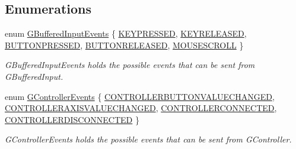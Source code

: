 \subsection*{Enumerations}
\begin{DoxyCompactItemize}
\item 
enum \mbox{\hyperlink{namespace_g_w_1_1_s_y_s_t_e_m_a309fd3a92512dd2bfa8065d99c0d7fcb}{G\+Buffered\+Input\+Events}} \{ \newline
\mbox{\hyperlink{namespace_g_w_1_1_s_y_s_t_e_m_a309fd3a92512dd2bfa8065d99c0d7fcbaf8bb58b0791c2d5d33b224213327f960}{K\+E\+Y\+P\+R\+E\+S\+S\+ED}}, 
\mbox{\hyperlink{namespace_g_w_1_1_s_y_s_t_e_m_a309fd3a92512dd2bfa8065d99c0d7fcbabb708a216e7e8ef33cc542e6def7a688}{K\+E\+Y\+R\+E\+L\+E\+A\+S\+ED}}, 
\mbox{\hyperlink{namespace_g_w_1_1_s_y_s_t_e_m_a309fd3a92512dd2bfa8065d99c0d7fcba56314f1a5b4d09751ed354a45a3a78fb}{B\+U\+T\+T\+O\+N\+P\+R\+E\+S\+S\+ED}}, 
\mbox{\hyperlink{namespace_g_w_1_1_s_y_s_t_e_m_a309fd3a92512dd2bfa8065d99c0d7fcba9f7d6e613de276b27e471cd30eac08de}{B\+U\+T\+T\+O\+N\+R\+E\+L\+E\+A\+S\+ED}}, 
\newline
\mbox{\hyperlink{namespace_g_w_1_1_s_y_s_t_e_m_a309fd3a92512dd2bfa8065d99c0d7fcbae4066728a571d6456cf5def5742a92bf}{M\+O\+U\+S\+E\+S\+C\+R\+O\+LL}}
 \}
\begin{DoxyCompactList}\small\item\em G\+Buffered\+Input\+Events holds the possible events that can be sent from G\+Buffered\+Input. \end{DoxyCompactList}\item 
enum \mbox{\hyperlink{namespace_g_w_1_1_s_y_s_t_e_m_a90b22b31302f4172043122adfa8e49d7}{G\+Controller\+Events}} \{ \mbox{\hyperlink{namespace_g_w_1_1_s_y_s_t_e_m_a90b22b31302f4172043122adfa8e49d7aa57b1c382c899e2a72f0691284971e93}{C\+O\+N\+T\+R\+O\+L\+L\+E\+R\+B\+U\+T\+T\+O\+N\+V\+A\+L\+U\+E\+C\+H\+A\+N\+G\+ED}}, 
\mbox{\hyperlink{namespace_g_w_1_1_s_y_s_t_e_m_a90b22b31302f4172043122adfa8e49d7a9d30e7d5901b3b0619caf4c027f2cb15}{C\+O\+N\+T\+R\+O\+L\+L\+E\+R\+A\+X\+I\+S\+V\+A\+L\+U\+E\+C\+H\+A\+N\+G\+ED}}, 
\mbox{\hyperlink{namespace_g_w_1_1_s_y_s_t_e_m_a90b22b31302f4172043122adfa8e49d7a797da82d4139f6f9ba5ce660389934f7}{C\+O\+N\+T\+R\+O\+L\+L\+E\+R\+C\+O\+N\+N\+E\+C\+T\+ED}}, 
\mbox{\hyperlink{namespace_g_w_1_1_s_y_s_t_e_m_a90b22b31302f4172043122adfa8e49d7a6e7765910e63d5babc83ee42acb46eb3}{C\+O\+N\+T\+R\+O\+L\+L\+E\+R\+D\+I\+S\+C\+O\+N\+N\+E\+C\+T\+ED}}
 \}
\begin{DoxyCompactList}\small\item\em G\+Controller\+Events holds the possible events that can be sent from G\+Controller. \end{DoxyCompactList}\item 

\end{DoxyCompactItemize}
